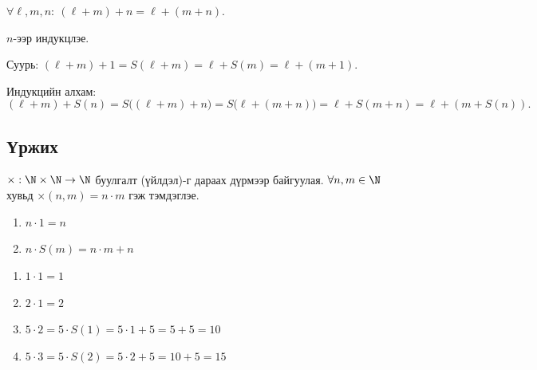 \begin{theorem}
$\forall \ell,m,n:\ (\ell+m)+n=\ell+(m+n)$.
\end{theorem}
\begin{prof}
$n$-ээр индукцлэе. 

Суурь: $(\ell+m)+1=S(\ell+m)=\ell+S(m)=\ell+(m+1).$ 

Индукцийн алхам:
\[(\ell+m)+S(n)=S\big((\ell+m)+n\big)=S\big(\ell+(m+n)\big)=\ell+S(m+n)=\ell+(m+S(n)).\]
\end{prof}

\subsection{Үржих}
 \begin{definition} $ \times : \N\times \N\to\N$ буулгалт (үйлдэл)-г дараах дүрмээр байгуулая. $\forall n , m\in\N$ хувьд $\times(n,m)=n\cdot m$ гэж тэмдэглэе.
\begin{enumerate}[label=\textbf{U\arabic*})]
    \item $ n\cdot 1= n$
    \item $n\cdot S(m)=n\cdot m+n$
\end{enumerate} 
\end{definition}
\begin{example}
    \begin{enumerate}
    \item $1\cdot 1=1$
    \item $2\cdot 1=2$
    \item $5\cdot 2=5\cdot S(1)=5\cdot 1+5=5+5=10$
    \item $5\cdot 3=5\cdot S(2)=5\cdot 2+5=10+5=15$
    \end{enumerate}
\end{example}
 
